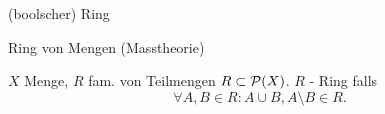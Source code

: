 \documentclass[class=article, crop=false]{standalone}
\begin{document}
\begin{zettel}{(boolscher) Ring}
\begin{flashcard}[ea1wvn25]{Ring von Mengen (Masstheorie)}
	\begin{definition}[Ring]
		$X$ Menge, $R$ fam. von Teilmengen $R \subset \mathcal{P}(X)$.
		$R$ - Ring falls
		\[
			\forall A,B \in  R : A \cup  B, A \setminus B \in  R
		.\]
	\end{definition}
\end{flashcard}
\end{zettel}
\end{document}
